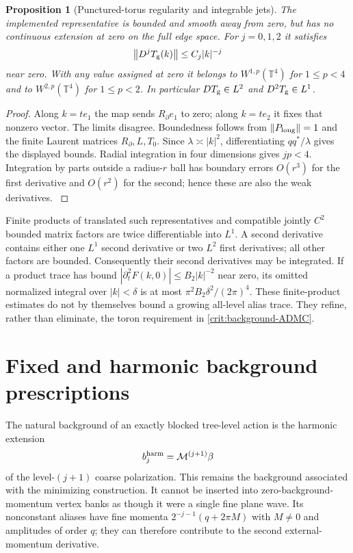 \documentclass[11pt,oneside,openany]{book}
\newtheorem{proposition}[proposition]{Proposition}
\theoremstyle{definition}
\theoremstyle{remark}
\newcommand{\T}{\mathbb T}
\newcommand{\norm}[1]{\left\lVert#1\right\rVert}
\newcommand{\src}[2]{\cite[#2]{#1}}
\begin{document}
\begin{proposition}[Punctured-torus regularity and integrable jets]
\label{prop:toron-regularity}
The implemented representative is bounded and smooth away from zero,
but has no continuous extension at zero on the full edge space. For
$j=0,1,2$ it satisfies
\[
 \norm{D^jT_{\rm g}(k)}\le C_j|k|^{-j}
\]
near zero. With any value assigned at zero it belongs to
$W^{1,p}(\T^4)$ for $1\le p<4$ and to $W^{2,p}(\T^4)$ for
$1\le p<2$. In particular $DT_{\rm g}\in L^2$ and
$D^2T_{\rm g}\in L^1$.
\end{proposition}
\begin{proof}
Along $k=te_1$ the map sends $R_{\partial}e_1$ to zero; along
$k=te_2$ it fixes that nonzero vector. The limits disagree. Boundedness
follows from $\norm{P_{\rm long}}=1$ and the finite Laurent matrices
$R_{\partial},L,T_0$. Since $\lambda\asymp|k|^2$, differentiating
$qq^*/\lambda$ gives the displayed bounds. Radial integration in four
dimensions gives $jp<4$. Integration by parts outside a radius-$r$
ball has boundary errors $O(r^3)$ for the first derivative and
$O(r^2)$ for the second; hence these are also the weak derivatives.
\src{F11}{V42}
\end{proof}
Finite products of translated such representatives and compatible
jointly $C^2$ bounded matrix factors are twice differentiable into
$L^1$. A second derivative contains either one $L^1$ second derivative
or two $L^2$ first derivatives; all other factors are bounded.
Consequently their second derivatives may be integrated. If a product
trace has bound $|\partial_t^2F(k,0)|\le B_2|k|^{-2}$ near zero, its
omitted normalized integral over $|k|<\delta$ is at most
$\pi^2B_2\delta^2/(2\pi)^4$. These finite-product estimates do not by
themselves bound a growing all-level alias trace. They refine, rather
than eliminate, the toron requirement in \cref{crit:background-ADMC}.

\section{Fixed and harmonic background prescriptions}
\label{sec:background-prescription}
The natural background of an exactly blocked tree-level action is the
harmonic extension
\begin{equation}\label{eq:harmonic-background}
b_j^{\rm harm}=\mathcal M^{(j+1)}\beta
\end{equation}
of the level-$(j+1)$ coarse polarization. This remains the background
associated with the minimizing construction. It cannot be inserted into
zero-background-momentum vertex banks as though it were a single fine
plane wave. Its nonconstant aliases have fine momenta
$2^{-j-1}(q+2\pi M)$ with $M\ne0$ and amplitudes of order $q$; they can
therefore contribute to the second external-momentum derivative.
\end{document}
